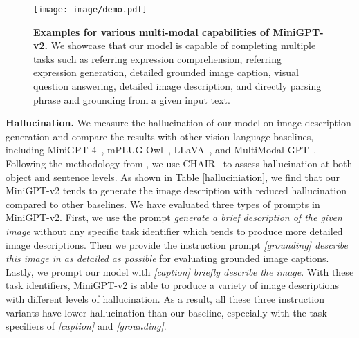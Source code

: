 \begin{figure}[t!]
    \centering
    \texttt{[image: image/demo.pdf]}
    \caption{\textbf{Examples for various multi-modal capabilities of MiniGPT-v2.} We showcase that our model is capable of completing multiple tasks such as referring expression comprehension, referring expression generation, detailed grounded image caption, visual question answering, detailed image description, and directly parsing phrase and grounding from a given input text. }
    \label{fig:demo}
\end{figure}





















\noindent \textbf{Hallucination.} We measure the hallucination of our model on image description generation and compare the results with other vision-language baselines, including MiniGPT-4~\citep{zhu2023minigpt}, mPLUG-Owl~\citep{mplugowl}, LLaVA~\citep{llava}, and MultiModal-GPT~\citep{gong2023multimodal}. Following the methodology from \citep{li2023evaluating}, we use CHAIR~\citep{rohrbach2018object} to assess hallucination at both object and sentence levels. As shown in Table \ref{halluciniation}, we find that our MiniGPT-v2 tends to generate the image description with reduced hallucination compared to other baselines. We have evaluated three types of prompts in MiniGPT-v2. 
First, we use the prompt \textit{generate a brief description of the given image} without any specific task identifier which tends to produce more detailed image descriptions. Then we provide the instruction prompt \textit{[grounding] describe this image in as detailed as possible} for evaluating grounded image captions. Lastly, we prompt our model with \textit{[caption] briefly describe the image}. With these task identifiers, MiniGPT-v2 is able to produce a variety of image descriptions with different levels of hallucination. As a result, all these three instruction variants have lower hallucination than our baseline, especially with the task specifiers of \textit{[caption]} and \textit{[grounding]}.















